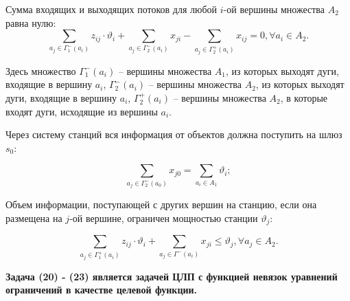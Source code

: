 \begin{frame}

    \fontsize{10pt}{5.2}\selectfont
    \justifying

    Сумма входящих и выходящих потоков для любой $i$-ой вершины множества $A_2$ равна нулю:
    \begin{equation}\label{eq:part2_1.2}
        \sum_{a_j \in \Gamma_1^-(a_i)} z_{ij} \cdot \vartheta_i + \sum_{a_j \in \Gamma_2^-(a_i)} x_{ji} -  \sum_{a_j \in \Gamma_2^+(a_i)} x_{ij} =0 ,\forall a_i \in A_2. 
    \end{equation}

    Здесь множество $\Gamma_1^-(a_i)$ – вершины множества $A_1$, из которых выходят дуги, входящие в вершину $a_i$, $\Gamma_2^-(a_i)$ – вершины множества $A_2$, из которых выходят дуги, входящие в  вершину $a_i$, $\Gamma_2^+(a_i)$ – вершины множества $A_2$, в которые входят дуги, исходящие из вершины $a_i$.
    \bigskip

    Через систему станций вся информация от объектов должна поступить  на шлюз $s_0$:

    \begin{equation}\label{eq:part2_1.3}
        \sum_{a_j \in \Gamma_2^-(a_0)} x_{j0} =  \sum_{a_i \in A_1} \vartheta_i;
    \end{equation}

    Объем информации, поступающей с других вершин на станцию, если она размещена на $j$-ой вершине, ограничен мощностью станции $\vartheta_j$:

    \begin{equation}\label{eq:part2_1.4}
        \sum_{a_j \in \Gamma_1^+(a_i)} z_{ij} \cdot \vartheta_i + \sum_{a_j \in \Gamma^-(a_i)} x_{ji} \leqslant \vartheta_j, \forall a_j \in A_2.
    \end{equation}


\textbf{Задача (20) - (23) является задачей ЦЛП с функцией невязок уравнений ограничений в качестве целевой функции.}

\end{frame}

